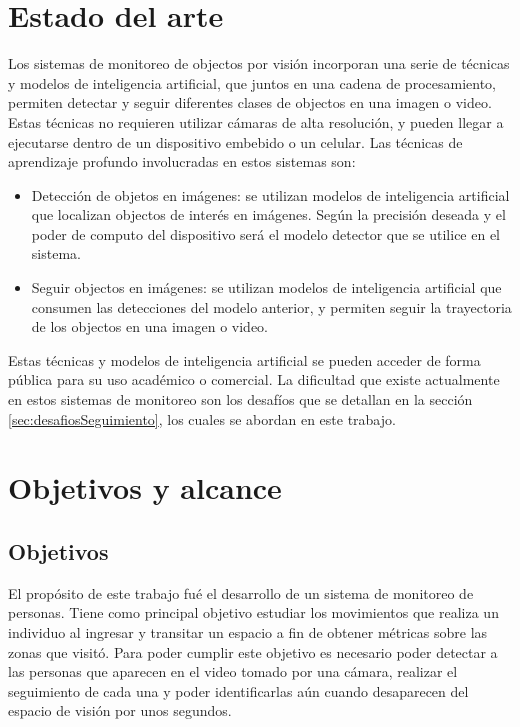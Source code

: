 \section{Estado del arte}
\label{sec:estadoDelArte}

Los sistemas de monitoreo de objectos por visión incorporan una serie de técnicas y modelos de inteligencia artificial, que juntos en una cadena de procesamiento, permiten detectar y seguir diferentes clases de objectos en una imagen o video. Estas técnicas no requieren utilizar cámaras de alta resolución, y pueden llegar a ejecutarse dentro de un dispositivo embebido o un celular. Las técnicas de aprendizaje profundo involucradas en estos sistemas son:

\begin{itemize}
\item Detección de objetos en imágenes: se utilizan modelos de inteligencia artificial que localizan objectos de interés en imágenes. Según la precisión deseada y el poder de computo del dispositivo será el modelo detector que se utilice en el sistema.
\item Seguir objectos en imágenes: se utilizan modelos de inteligencia artificial que consumen las detecciones del modelo anterior, y permiten seguir la trayectoria de los objectos en una imagen o video.
\end{itemize}

Estas técnicas y modelos de inteligencia artificial se pueden acceder de forma pública para su uso académico o comercial. La dificultad que existe actualmente en estos sistemas de monitoreo son los desafíos que se detallan en la sección \ref{sec:desafiosSeguimiento}, los cuales se abordan en este trabajo.


\section{Objetivos y alcance}
\label{sec:objetivosAlcance}

\subsection{Objetivos}

El propósito de este trabajo fué el desarrollo de un sistema de monitoreo de personas. Tiene como principal objetivo estudiar los movimientos que realiza un individuo al ingresar y transitar un espacio a fin de obtener métricas sobre las zonas que visitó. Para poder cumplir este objetivo es necesario poder detectar a las personas que aparecen en el video tomado por una cámara, realizar el seguimiento de cada una y poder identificarlas aún cuando desaparecen del espacio de visión por unos segundos.


